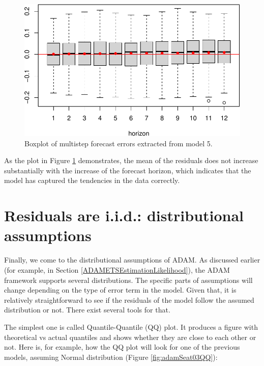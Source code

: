 \documentclass[]{book}
\theoremstyle{definition}
\theoremstyle{definition}
\theoremstyle{definition}
\theoremstyle{definition}
\theoremstyle{remark}
\begin{document}
\begin{figure}
\centering
\includegraphics{Svetunkov--2022----ADAM_files/figure-latex/adamSeat05Multistep-1.pdf}
\caption{\label{fig:adamSeat05Multistep}Boxplot of multistep forecast errors extracted from model 5.}
\end{figure}

As the plot in Figure \ref{fig:adamSeat05Multistep} demonstrates, the mean of the residuals does not increase substantially with the increase of the forecast horizon, which indicates that the model has captured the tendencies in the data correctly.

\hypertarget{diagnosticsResidualsIIDDistribution}{%
\section{Residuals are i.i.d.: distributional assumptions}\label{diagnosticsResidualsIIDDistribution}}

Finally, we come to the distributional assumptions of ADAM. As discussed earlier (for example, in Section \ref{ADAMETSEstimationLikelihood}), the ADAM framework supports several distributions. The specific parts of assumptions will change depending on the type of error term in the model. Given that, it is relatively straightforward to see if the residuals of the model follow the assumed distribution or not. There exist several tools for that.

The simplest one is called Quantile-Quantile (QQ) plot. It produces a figure with theoretical vs actual quantiles and shows whether they are close to each other or not. Here is, for example, how the QQ plot will look for one of the previous models, assuming Normal distribution (Figure \ref{fig:adamSeat03QQ}):
\end{document}
